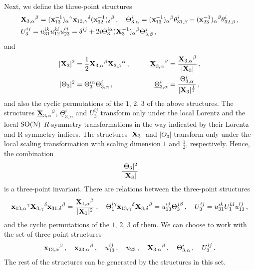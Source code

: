 \documentclass[11pt]{article}
\begin{document}
%
Next, we define the three-point structures
%
\begin{equation}
\begin{split}
&{\bf X}_{3,\alpha}{}^\beta=({\bf x}_{13}^{-1})_\alpha{}^\gamma {\bf x}_{12,\gamma}{}^\delta({\bf x}_{32}^{-1})_\delta{}^\beta\,,\quad \Theta^i_{3,\alpha} = ({\bf x}_{13}^{-1})_\alpha{}^\beta \theta^i_{31,\beta} -({\bf x}_{23}^{-1})_\alpha{}^\beta \theta^i_{32,\beta}\,,
\\
&U_3^{ij}=u_{31}^{ik}u_{12}^{kl}u_{23}^{lj}=\delta^{ij} + 2 i \Theta_3^{i\alpha} ({\bf X}_3^{-1})_\alpha{}^\beta \Theta_{3,\beta}^{j}\,,
\end{split}
\end{equation}
%
and
%
\begin{equation}
\begin{aligned}
  |{\bf X}_3|^2
  &=\frac{1}{2}{\bf X}_{3,\alpha}{}^\beta{\bf X}_{3,\beta}{}^\alpha\,, & \qquad 
  \underline{\bf X}_{3,\alpha}{}^\beta
  &=\frac{{\bf X}_{3,\alpha}{}^\beta}{ |{\bf X}_3|}\,,
\\
  |\Theta_3|^2&=
  \Theta_3^{i\alpha}\Theta_{3,\alpha}^i\,,&\qquad 
  \underline\Theta_{3,\alpha}^i
  &=
  \frac{\Theta_{3,\alpha}^i}{ |{\bf X}_3|^\frac{1}{2}}\,,
\end{aligned}
\end{equation}
%
and also the cyclic permutations of the $1,\,2,\,3$ of the above structures. The structures $\underline{\bf X}_{3,\alpha}{}^\beta$, $\underline\Theta_{3,\alpha}^i$ and $U_3^{ij}$ transform only under the local Lorentz and the local ${\rm SO}({\cal N})$ $R$-symmetry transformations in the way indicated by their Lorentz and R-symmetry indices. The structures $|{\bf X}_3|$ and $|\Theta_3|$ transform only under the local scaling transformation with scaling dimension $1$ and $\frac{1}{2}$, respectively. Hence, the combination
%
\begin{equation}
\frac{|\Theta_3|^2}{ |{\bf X}_3|}
\end{equation}
is a three-point invariant. There are relations between the three-point structures
%
\begin{equation}
{\bf x}_{13,\alpha}{}^\gamma {\bf X}_{3,\gamma}{}^\delta {\bf x}_{31,\delta}{}^\beta=
\frac{{\bf X}_{1,\alpha}{}^\beta}{ |{\bf X}_1|^2}\,,\quad \Theta_1^{i\gamma}{\bf x}_{13,\gamma}{}^\delta {\bf X}_{3,\delta}{}^\beta=u_{13}^{ij}\Theta^{j\beta}_3\,,\quad U^{ij}_3=u^{ik}_{31}U_1^{kl}u_{13}^{lj}\,,
\end{equation}
%
and the cyclic permutations of the $1,\,2,\,3$ of them. We can choose to work with the set of three-point structures
%
\begin{equation}
{\bf x}_{13,\alpha}{}^\beta\,,\quad {\bf x}_{23,\alpha}{}^\beta\,,\quad u_{13}^{ij}\,,\quad u_{23}\,,\quad {\bf X}_{3,\alpha}{}^\beta\,,\quad \Theta_{3,\alpha}^i\,,\quad U_3^{ij}\,.
\end{equation}
%
The rest of the structures can be generated by the structures in this set.
\end{document}
